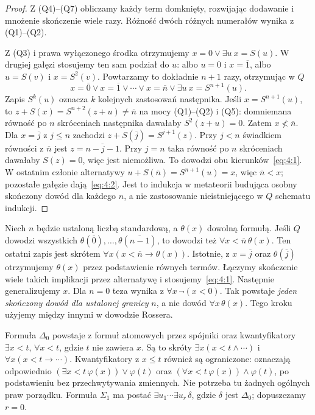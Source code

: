 \begin{proof}
Z (Q4)--(Q7) obliczamy każdy term domknięty, rozwijając dodawanie i mnożenie skończenie wiele razy. Różność dwóch różnych numerałów wynika z (Q1)--(Q2).

Z (Q3) i prawa wyłączonego środka otrzymujemy $x=0\lor\exists u\ x=S(u)$. W drugiej gałęzi stosujemy ten sam podział do $u$: albo $u=0$ i $x=\overline1$, albo $u=S(v)$ i $x=S^2(v)$. Powtarzamy to dokładnie $n+1$ razy, otrzymując w $Q$
\[
x=\overline0\lor x=\overline1\lor\cdots\lor x=\overline n\lor\exists u\ x=S^{n+1}(u).
\]
Zapis $S^k(u)$ oznacza $k$ kolejnych zastosowań następnika. Jeśli $x=S^{n+1}(u)$, to $z+S(x)=S^{n+2}(z+u)\ne\overline n$ na mocy (Q1)--(Q2) i (Q5): domniemana równość po $n$ skróceniach następnika dawałaby $S^2(z+u)=0$. Zatem $x\not<\overline n$. Dla $x=\overline j$ z $j\le n$ zachodzi $z+S(\overline j)=S^{j+1}(z)$. Przy $j<n$ świadkiem równości z $\overline n$ jest $z=\overline{n-j-1}$. Przy $j=n$ taka równość po $n$ skróceniach dawałaby $S(z)=0$, więc jest niemożliwa. To dowodzi obu kierunków~\eqref{eq:4:1}. W ostatnim członie alternatywy $u+S(\overline n)=S^{n+1}(u)=x$, więc $\overline n<x$; pozostałe gałęzie dają~\eqref{eq:4:2}. Jest to indukcja w metateorii budująca osobny skończony dowód dla każdego $n$, a nie zastosowanie nieistniejącego w $Q$ schematu indukcji.
\end{proof}

\begin{uwaga}\label{res:4:5}
Niech $n$ będzie ustaloną liczbą standardową, a $\theta(x)$ dowolną formułą. Jeśli $Q$ dowodzi wszystkich $\theta(\overline0),\ldots,\theta(\overline{n-1})$, to dowodzi też $\forall x<\overline n\,\theta(x)$. Ten ostatni zapis jest skrótem $\forall x(x<\overline n\to\theta(x))$. Istotnie, z $x=\overline j$ oraz $\theta(\overline j)$ otrzymujemy $\theta(x)$ przez podstawienie równych termów. Łączymy skończenie wiele takich implikacji przez alternatywę i stosujemy~\eqref{eq:4:1}. Następnie generalizujemy $x$. Dla $n=0$ teza wynika z $\forall x\,\neg(x<0)$. Tak powstaje \emph{jeden skończony dowód dla ustalonej granicy} $n$, a nie dowód $\forall x\,\theta(x)$. Tego kroku użyjemy między innymi w dowodzie Rossera.
\end{uwaga}

\begin{definicja}\label{res:4:6}
Formuła $\Delta_0$ powstaje z formuł atomowych przez spójniki oraz kwantyfikatory $\exists x<t$, $\forall x<t$, gdzie $t$ nie zawiera $x$. Są to skróty $\exists x(x<t\land\cdots)$ i $\forall x(x<t\to\cdots)$. Kwantyfikatory z $x\le t$ również są ograniczone: oznaczają odpowiednio $(\exists x<t\,\varphi(x))\lor\varphi(t)$ oraz $(\forall x<t\,\varphi(x))\land\varphi(t)$, po podstawieniu bez przechwytywania zmiennych. Nie potrzeba tu żadnych ogólnych praw porządku. Formuła $\Sigma_1$ ma postać $\exists u_1\cdots\exists u_r\,\delta$, gdzie $\delta$ jest $\Delta_0$; dopuszczamy $r=0$.
\end{definicja}

